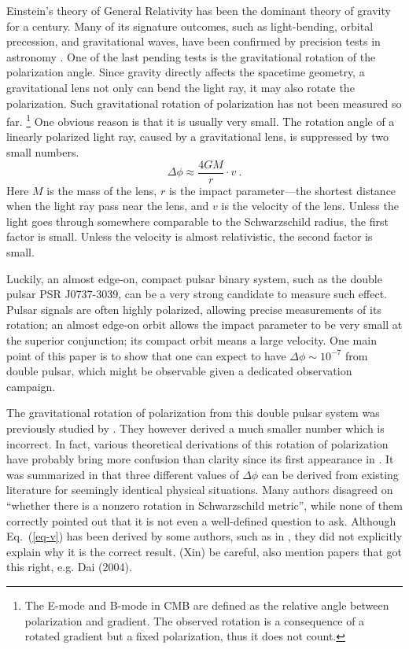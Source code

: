\documentclass[aps,showpacs,twocolumn,floats,prd,superscriptaddress,nofootinbib]{revtex4}
\begin{document}
Einstein's theory of General Relativity has been the dominant theory of gravity for a century. 
Many of its signature outcomes, such as light-bending, orbital precession, and gravitational waves, have been confirmed by precision tests in astronomy \cite{DysEdd20,KraSta97,WeiTay04,Abb16}. 
One of the last pending tests is the gravitational rotation of the polarization angle. 
Since gravity directly affects the spacetime geometry, a gravitational lens not only can bend the light ray, it may also rotate the polarization.
Such gravitational rotation of polarization has not been measured so far.
\footnote{The E-mode and B-mode in CMB are defined as the relative angle between polarization and gradient. 
The observed rotation is a consequence of a rotated gradient but a fixed polarization, thus it does not count.} 
One obvious reason is that it is usually very small. 
The rotation angle of a linearly polarized light ray, caused by a gravitational lens, is suppressed by two small numbers.
\begin{equation}
\Delta\phi \approx \frac{4GM}{r} \cdot v~.
\label{eq-v}
\end{equation}
Here $M$ is the mass of the lens, $r$ is the impact parameter---the shortest distance when the light ray pass near the lens, and $v$ is the velocity of the lens.  
Unless the light goes through somewhere comparable to the Schwarzschild radius, the first factor is small. 
Unless the velocity is almost relativistic, the second factor is small. 

Luckily, an almost edge-on, compact pulsar binary system, such as the double pulsar PSR J0737-3039, can be a very strong candidate to measure such effect. 
Pulsar signals are often highly polarized, allowing precise measurements of its rotation; 
an almost edge-on orbit allows the impact parameter to be very small at the superior conjunction; 
its compact orbit means a large velocity. 
One main point of this paper is to show that one can expect to have $\Delta\phi\sim 10^{-7}$ from double pulsar, which might be observable given a dedicated observation campaign.

The gravitational rotation of polarization from this double pulsar system was previously studied by \cite{RugTar06}. 
They however derived a much smaller number which is incorrect. 
In fact, various theoretical derivations of this rotation of polarization have probably bring more confusion  %
than clarity since its first appearance in \cite{Skr57}.
{\color{blue} It was summarized in \cite{BroDem11} that three different values of $\Delta\phi$ can be derived from existing literature for seemingly identical physical situations.
Many authors disagreed on ``whether there is a nonzero rotation in Schwarzschild metric'', while none of them correctly pointed out that it is not even a well-defined question to ask.
Although Eq.~(\ref{eq-v}) has been derived by some authors, such as in \cite{KopMas01}, they did not explicitly explain why it is the correct result. }
{\color{red} (Xin) be careful, also mention papers that got this right, e.g. Dai (2004). }
\end{document}
